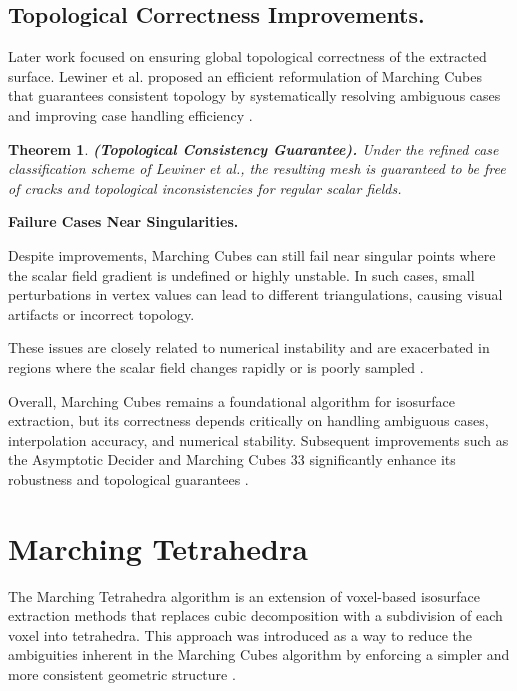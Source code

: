 \documentclass[12pt, a4paper, oneside]{book}
\theoremstyle{plain}
\newtheorem{theorem}{Theorem}[chapter]
\theoremstyle{definition}
\theoremstyle{remark}
\theoremstyle{definition}
\begin{document}
\subsection{Topological Correctness Improvements.}

Later work focused on ensuring global topological correctness of the extracted surface. Lewiner et al. proposed an efficient reformulation of Marching Cubes that guarantees consistent topology by systematically resolving ambiguous cases and improving case handling efficiency \cite{lewiner2003efficient}.

\begin{theorem}
    \textbf{ (Topological Consistency Guarantee).}
Under the refined case classification scheme of Lewiner et al., the resulting mesh is guaranteed to be free of cracks and topological inconsistencies for regular scalar fields.
\end{theorem}


\vspace{0.5em}

\textbf{Failure Cases Near Singularities.}

Despite improvements, Marching Cubes can still fail near singular points where the scalar field gradient is undefined or highly unstable. In such cases, small perturbations in vertex values can lead to different triangulations, causing visual artifacts or incorrect topology.

These issues are closely related to numerical instability and are exacerbated in regions where the scalar field changes rapidly or is poorly sampled \cite{lorensen1998marching,lewiner2003efficient}.

\vspace{0.5em}

Overall, Marching Cubes remains a foundational algorithm for isosurface extraction, but its correctness depends critically on handling ambiguous cases, interpolation accuracy, and numerical stability. Subsequent improvements such as the Asymptotic Decider and Marching Cubes 33 significantly enhance its robustness and topological guarantees \cite{lorensen1998marching,nielson1991asymptotic,chernyaev1995mc33,lewiner2003mc}.

\section{Marching Tetrahedra}

The Marching Tetrahedra algorithm is an extension of voxel-based isosurface extraction methods that replaces cubic decomposition with a subdivision of each voxel into tetrahedra. This approach was introduced as a way to reduce the ambiguities inherent in the Marching Cubes algorithm by enforcing a simpler and more consistent geometric structure \cite{shirley1990marching}.
\end{document}
